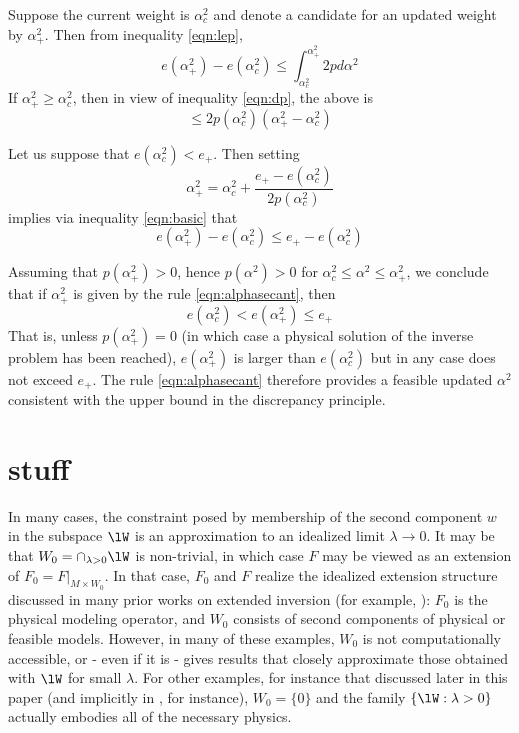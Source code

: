 Suppose the current weight is $\alpha^2_c$ and denote a candidate for an updated weight by $\alpha^2_+$. Then from inequality \ref{eqn:lep},
\begin{equation}
e(\alpha^2_+)-e(\alpha^2_c) \le \int_{\alpha^2_c}^{\alpha^2_+} 2p d\alpha^2
\end{equation}
If $\alpha^2_+ \ge \alpha^2_c$, then in view of inequality \ref{eqn:dp}, the above is
\begin{equation}
\label{eqn:basic}
\le 2 p(\alpha^2_c) (\alpha^2_+-\alpha^2_c)  
\end{equation}

Let us suppose that $e(\alpha^2_c) < e_{+}$. Then setting 
\begin{equation}
\label{eqn:alphasecant}
\alpha^2_+ = \alpha^2_c + \frac{e_{+}-e(\alpha^2_c)}{2p(\alpha^2_c)} 
\end{equation}
implies via inequality \ref{eqn:basic} that 
\begin{equation}
e(\alpha^2_+)-e(\alpha^2_c) \le e_{+}-e(\alpha^2_c)
\end{equation}

Assuming that $p(\alpha^2_+) > 0$, hence $p(\alpha^2)>0$ for $\alpha^2_c \le \alpha^2 \le \alpha^2_+$,  we conclude that if $\alpha^2_+$ is given by the rule \ref{eqn:alphasecant},
then
\begin{equation}
\label{eqn:assert}
e(\alpha^2_c) < e(\alpha^2_+) \le e_{+}
\end{equation}
That is, unless $p(\alpha^2_+) = 0$ (in which case a physical solution of the inverse problem has been reached),  $e(\alpha^2_+)$ is larger than $e(\alpha^2_c)$ but in any case does not exceed $e_+$. The rule \ref{eqn:alphasecant} therefore provides a feasible updated $\alpha^2$ consistent with the upper bound in the discrepancy principle.


\section{stuff}
In many cases, the constraint posed by membership of the second component $w$ in the subspace $\lW$ is an approximation to an idealized limit $\lambda \rightarrow 0$.
It may be that $W_0 = \cap_{\lambda > 0}\lW$ is non-trivial, in which
case $F$ may be viewed as an extension of $F_0 = F|_{ M \times
  W_0}$. In that case, $F_0$ and $F$ realize the idealized extension
structure discussed in many prior works on extended inversion (for
example, \cite[]{geoprosp:2008}): $F_0$ is the physical modeling
operator, and $W_0$ consists of second components of physical or
feasible models. However, in many of these examples, $W_0$ is not
computationally accessible, or - even if it is - gives results that
closely approximate those obtained with $\lW$ for small $\lambda$. For
other examples, for instance that  discussed later in this paper (and
implicitly in \cite[]{Warner:16}, for instance), $W_0=\{0\}$ and the
family $\{\lW: \lambda > 0\}$ actually embodies all of the necessary
physics.



